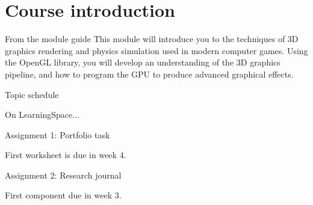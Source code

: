 \part{Course introduction}
\frame{\partpage}

\begin{frame}{From the module guide}
This module will introduce you to the techniques of 3D graphics rendering and physics simulation used in modern computer games. Using the OpenGL library, you will develop an understanding of the 3D graphics pipeline, and how to program the GPU to produce advanced graphical effects.
\end{frame}

\begin{frame}{Topic schedule}
	\begin{center}
		On LearningSpace...
	\end{center}
\end{frame}

\begin{frame}{Assignment 1: Portfolio task}
	\begin{center}
		First worksheet is due in week 4.
	\end{center}
\end{frame}

\begin{frame}{Assignment 2: Research journal}
	\begin{center}
		First component due in week 3.
	\end{center}
\end{frame}
